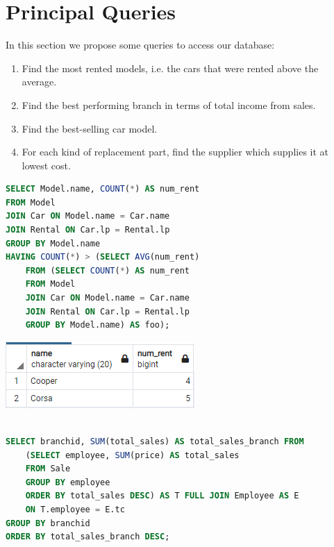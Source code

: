 \section{Principal Queries}

In this section we propose some queries to access our database:

\begin{enumerate}
	\item Find the most rented models, i.e. the cars that were rented above the average.
	\item Find the best performing branch in terms of total income from sales.
	\item Find the best-selling car model.
	\item For each kind of replacement part, find the supplier which supplies it at lowest cost.
\end{enumerate}

\begin{lstlisting}[language=SQL,
keywordstyle=\color{blue},
stringstyle=\color{mauve},
showstringspaces=false,
basicstyle=\ttfamily\footnotesize]
SELECT Model.name, COUNT(*) AS num_rent
FROM Model
JOIN Car ON Model.name = Car.name
JOIN Rental ON Car.lp = Rental.lp
GROUP BY Model.name
HAVING COUNT(*) > (SELECT AVG(num_rent)
    FROM (SELECT COUNT(*) AS num_rent
    FROM Model
    JOIN Car ON Model.name = Car.name
    JOIN Rental ON Car.lp = Rental.lp
    GROUP BY Model.name) AS foo);
\end{lstlisting}

\begin{center}
	\includegraphics[scale=0.75]{1query.png}
\end{center}

\begin{lstlisting}[language=SQL,
keywordstyle=\color{blue},
stringstyle=\color{mauve},
showstringspaces=false,
basicstyle=\ttfamily\footnotesize]

SELECT branchid, SUM(total_sales) AS total_sales_branch FROM
    (SELECT employee, SUM(price) AS total_sales
    FROM Sale
    GROUP BY employee
    ORDER BY total_sales DESC) AS T FULL JOIN Employee AS E
    ON T.employee = E.tc
GROUP BY branchid
ORDER BY total_sales_branch DESC;
\end{lstlisting}

